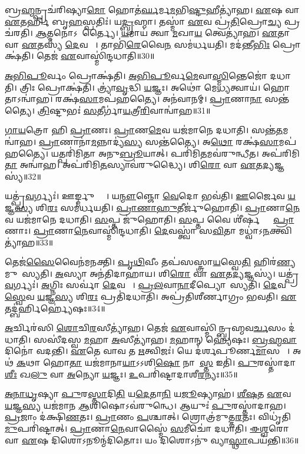 𑌬𑍍𑌰\ul{𑌹𑍍𑌮}𑌨𑍍𑌪𑍍𑌰𑌚॑𑌰𑌿𑌷𑍍𑌯𑌾\ul{𑌮𑍋} 𑌹𑍋𑌤॑\ul{𑌰𑍍𑌘}𑌰𑍍𑌮\ul{𑌮}𑌭𑌿\ul{𑌷𑍍𑌟𑍁}𑌹𑍀𑌤𑍍𑌯𑌾॑𑌹। 
\ul{𑌏}𑌷 𑌵𑌾 \ul{𑌏}𑌤𑌰𑍍\mbox{}\ul{𑌹𑌿} 𑌬𑍃\ul{𑌹}𑌸𑍍𑌪𑌤𑌿𑌃॑। 
𑌯\ul{𑌦𑍍𑌬𑍍𑌰}𑌹𑍍𑌮𑌾। 
𑌤𑌸𑍍𑌮𑌾॑ \ul{𑌏}𑌵 𑌪𑍍𑌰॑\ul{𑌤𑌿}𑌪𑍍𑌰𑍋\ul{𑌚𑍍𑌯} 𑌪𑍍𑌰𑌚॑𑌰𑌤𑌿। 
\ul{𑌆}𑌤𑍍𑌮𑌨𑍋𑌽𑌨𑌾᳚𑌰𑍍𑌤𑍍𑌯𑍈। 
\ul{𑌯}𑌮𑌾𑌯॑ 𑌤𑍍𑌵𑌾 \ul{𑌮}𑌖𑌾\ul{𑌯} 𑌤𑍍𑌵𑍇𑌤𑍍𑌯𑌾॑𑌹। 
\ul{𑌏}𑌤𑌾 𑌵𑌾 \ul{𑌏}𑌤𑌸𑍍𑌯॑ \ul{𑌦𑍇}𑌵𑌤𑌾𑌃᳚। 
𑌤𑌾𑌭𑌿॑\ul{𑌰𑍇}𑌵𑍈\ul{𑌨}\ul{} 𑌸𑌮॑𑌰𑍍𑌧𑌯𑌤𑌿। 
𑌮𑌦॑𑌨𑍍𑌤𑍀\ul{𑌭𑌿𑌃} 𑌪𑍍𑌰𑍋𑌕𑍍𑌷॑𑌤𑌿। 
𑌤𑍇𑌜॑ \ul{𑌏}𑌵𑌾𑌸𑍍𑌮𑌿॑𑌨𑍍𑌦𑌧𑌾𑌤𑌿॥30॥

\ul{𑌅}\ul{𑌭𑌿}\ul{𑌪𑍂}𑌰𑍍𑌵𑌂 𑌪𑍍𑌰𑍋𑌕𑍍𑌷॑𑌤𑌿। 
\ul{𑌅}\ul{𑌭𑌿}\ul{𑌪𑍂}𑌰𑍍𑌵\ul{𑌮𑍇}𑌵𑌾\ul{𑌸𑍍𑌮𑌿}𑌨𑍍𑌤𑍇𑌜𑍋॑ 𑌦𑌧𑌾𑌤𑌿। 
𑌤𑍍𑌰𑌿𑌃 𑌪𑍍𑌰𑍋𑌕𑍍𑌷॑𑌤𑌿। 
𑌤𑍍𑌰𑍍𑌯𑌾॑\ul{𑌵𑍃}𑌦𑍍𑌧𑌿 \ul{𑌯}𑌜𑍍𑌞𑌃। 
𑌅𑌥𑍋॑ 𑌮𑍇\ul{𑌧𑍍𑌯}𑌤𑍍𑌵𑌾𑌯॑। 
𑌹𑍋𑌤𑌾𑌽𑌨𑍍𑌵𑌾॑𑌹। 
𑌰𑌕𑍍𑌷॑\ul{𑌸𑌾}𑌮𑌪॑𑌹𑌤𑍍𑌯𑍈। 
𑌅𑌨॑𑌵𑌾𑌨𑌮𑍍। 
\ul{𑌪𑍍𑌰𑌾}𑌣𑌾\ul{𑌨𑌾}\ul{} 𑌸𑌨𑍍𑌤॑𑌤𑍍𑌯𑍈। 
\ul{𑌤𑍍𑌰𑌿}𑌷𑍍𑌟𑍁𑌭𑌃॑ \ul{𑌸}𑌤𑍀𑌰𑍍𑌗𑌾॑\ul{𑌯}𑌤𑍍𑌰𑍀\ul{𑌰𑌿}𑌵𑌾𑌨𑍍𑌵𑌾॑𑌹॥31॥

\ul{𑌗𑌾}\ul{𑌯}𑌤𑍍𑌰𑍋 𑌹𑌿 \ul{𑌪𑍍𑌰𑌾}𑌣𑌃। 
\ul{𑌪𑍍𑌰𑌾}𑌣\ul{𑌮𑍇}𑌵 𑌯𑌜॑𑌮𑌾𑌨𑍇 𑌦𑌧𑌾𑌤𑌿। 
𑌸𑌨𑍍𑌤॑\ul{𑌤}𑌮𑌨𑍍𑌵𑌾॑𑌹। 
\ul{𑌪𑍍𑌰𑌾}𑌣𑌾𑌨𑌾॑\ul{𑌮}𑌨𑍍𑌨𑌾𑌦𑍍𑌯॑\ul{𑌸𑍍𑌯} 𑌸𑌨𑍍𑌤॑𑌤𑍍𑌯𑍈। 
𑌅\ul{𑌥𑍋} 𑌰𑌕𑍍𑌷॑\ul{𑌸𑌾}𑌮𑌪॑𑌹𑌤𑍍𑌯𑍈। 
𑌯𑌤𑍍𑌪𑌰𑌿॑𑌮𑌿𑌤𑌾 𑌅𑌨𑍁\ul{𑌬𑍍𑌰𑍂}𑌯𑌾𑌤𑍍। 
𑌪𑌰𑌿॑𑌮𑌿\ul{𑌤}𑌮𑌵॑𑌰𑍁𑌨𑍍𑌧𑍀𑌤। 
𑌅𑌪॑𑌰𑌿𑌮𑌿\ul{𑌤𑌾} 𑌅𑌨𑍍𑌵𑌾॑𑌹। 
𑌅𑌪॑𑌰𑌿𑌮𑌿\ul{𑌤}𑌸𑍍𑌯𑌾𑌵॑𑌰𑍁𑌦𑍍𑌧𑍍𑌯𑍈। 
𑌶𑌿\ul{𑌰𑍋} 𑌵𑌾 \ul{𑌏}𑌤\ul{𑌦𑍍𑌯}𑌜𑍍𑌞𑌸𑍍𑌯॑॥32॥

𑌯𑌤𑍍𑌪𑍍𑌰॑\ul{𑌵}𑌰𑍍𑌗𑍍𑌯𑌃॑। 
𑌊𑌰𑍍𑌙𑍍𑌮𑍁𑌞𑍍𑌜𑌾𑌃᳚। 
𑌯\ul{𑌨𑍍𑌮𑍗}𑌞𑍍𑌜𑍋 \ul{𑌵𑍇}𑌦𑍋 𑌭𑌵॑𑌤𑌿। 
\ul{𑌊}𑌰𑍍𑌜𑍈𑌵 \ul{𑌯}𑌜𑍍𑌞\ul{𑌸𑍍𑌯} 𑌶𑌿\ul{𑌰𑌃} 𑌸𑌮॑𑌰𑍍𑌧𑌯𑌤𑌿। 
\ul{𑌪𑍍𑌰𑌾}\ul{𑌣𑌾}\ul{𑌹𑍁}𑌤𑍀𑌰𑍍𑌜𑍁॑𑌹𑍋𑌤𑌿। 
\ul{𑌪𑍍𑌰𑌾}𑌣𑌾\ul{𑌨𑍇}𑌵 𑌯𑌜॑𑌮𑌾𑌨𑍇 𑌦𑌧𑌾𑌤𑌿। 
\ul{𑌸}𑌪𑍍𑌤 𑌜𑍁॑𑌹𑍋𑌤𑌿। 
\ul{𑌸}𑌪𑍍𑌤 𑌵𑍈 𑌶𑍀॑𑌰𑍍\mbox{}\ul{𑌷}𑌣𑍍𑌯𑌾𑌃᳚ \ul{𑌪𑍍𑌰𑌾}𑌣𑌾𑌃। 
\ul{𑌪𑍍𑌰𑌾}𑌣𑌾\ul{𑌨𑍇}𑌵𑌾𑌸𑍍𑌮𑌿॑𑌨𑍍𑌦𑌧𑌾𑌤𑌿। 
\ul{𑌦𑍇}𑌵𑌸𑍍𑌤𑍍𑌵𑌾॑ 𑌸\ul{𑌵𑌿}𑌤𑌾 𑌮𑌧𑍍𑌵𑌾॑𑌽\ul{𑌨}𑌕𑍍𑌤𑍍𑌵𑌿𑌤𑍍𑌯𑌾॑𑌹॥33॥

𑌤𑍇𑌜॑\ul{𑌸𑍈}𑌵𑍈𑌨॑𑌮𑌨𑌕𑍍𑌤𑌿। 
\ul{𑌪𑍃}\ul{𑌥𑌿}𑌵𑍀𑌂 𑌤𑌪॑𑌸𑌸𑍍𑌤𑍍𑌰𑌾\ul{𑌯}𑌸𑍍𑌵𑍇\ul{𑌤𑌿} 𑌹𑌿𑌰॑\ul{𑌣𑍍𑌯}𑌮𑍁𑌪𑌾᳚𑌸𑍍𑌯𑌤𑌿। 
\ul{𑌅}𑌸𑍍𑌯𑌾 𑌅𑌨॑𑌤𑌿𑌦𑌾𑌹𑌾𑌯। 
𑌶𑌿\ul{𑌰𑍋} 𑌵𑌾 \ul{𑌏}𑌤\ul{𑌦𑍍𑌯}𑌜𑍍𑌞𑌸𑍍𑌯॑। 
𑌯𑌤𑍍𑌪𑍍𑌰॑\ul{𑌵}𑌰𑍍𑌗𑍍𑌯𑌃॑। 
\ul{𑌅}𑌗𑍍𑌨𑌿𑌃 𑌸𑌰𑍍𑌵𑌾॑ \ul{𑌦𑍇}𑌵𑌤𑌾𑌃᳚। 
\ul{𑌪𑍍𑌰}\ul{𑌲}𑌵𑌾\ul{𑌨𑌾}𑌦𑍀𑌪𑍍𑌯𑍋𑌪𑌾᳚𑌸𑍍𑌯𑌤𑌿। 
\ul{𑌦𑍇}𑌵𑌤𑌾᳚\ul{𑌸𑍍𑌵𑍇}𑌵 \ul{𑌯}𑌜𑍍𑌞\ul{𑌸𑍍𑌯} 𑌶𑌿\ul{𑌰𑌃} 𑌪𑍍𑌰𑌤𑌿॑𑌦𑌧𑌾𑌤𑌿। 
𑌅𑌪𑍍𑌰॑𑌤𑌿𑌶𑍀𑌰𑍍𑌣𑌾𑌗𑍍𑌰𑌂 𑌭𑌵𑌤𑌿। 
\ul{𑌏}𑌤𑌦𑍍𑌬॑𑌰𑍍\mbox{}\ul{𑌹𑌿}𑌰𑍍\mbox{}𑌹𑍍𑌯𑍇॑𑌷𑌃॥34॥

\ul{𑌅}𑌰𑍍𑌚𑌿𑌰॑𑌸𑌿 \ul{𑌶𑍋}𑌚𑌿\ul{𑌰}𑌸𑍀𑌤𑍍𑌯𑌾॑𑌹। 
𑌤𑍇𑌜॑ \ul{𑌏}𑌵𑌾𑌸𑍍𑌮𑌿॑𑌨𑍍𑌬𑍍𑌰𑌹𑍍𑌮𑌵\ul{𑌰𑍍𑌚}𑌸𑌂 𑌦॑𑌧𑌾𑌤𑌿। 
𑌸𑌸𑍀॑𑌦𑌸𑍍𑌵 \ul{𑌮}𑌹𑌾 \ul{𑌅}𑌸𑍀𑌤𑍍𑌯𑌾॑𑌹। 
\ul{𑌮}𑌹𑌾𑌨𑍍 𑌹𑍍𑌯𑍇॑𑌷𑌃। 
\ul{𑌬𑍍𑌰}\ul{𑌹𑍍𑌮}\ul{𑌵𑌾}𑌦𑌿𑌨𑍋॑ 𑌵𑌦𑌨𑍍𑌤𑌿। 
\ul{𑌏}𑌤𑍇 𑌵𑌾𑌵 𑌤 \ul{𑌋}𑌤𑍍𑌵𑌿𑌜𑌃॑। 
𑌯𑍇 𑌦॑𑌰𑍍\mbox{}𑌶𑌪𑍂𑌰𑍍𑌣\ul{𑌮𑌾}𑌸𑌯𑍋𑌃᳚। 
𑌅𑌥॑ \ul{𑌕}𑌥𑌾 𑌹𑍋\ul{𑌤𑌾} 𑌯𑌜॑𑌮𑌾𑌨𑌾\ul{𑌯𑌾}𑌽𑌽𑌶𑌿\ul{𑌷𑍋} 𑌨𑌾𑌶𑌾᳚\ul{𑌸𑍍𑌤} 𑌇𑌤𑌿॑। 
\ul{𑌪𑍁}𑌰𑌸𑍍𑌤𑌾॑𑌦𑌾\ul{𑌶𑍀𑌃} 𑌖\ul{𑌲𑍁} 𑌵𑌾 \ul{𑌅}𑌨𑍍𑌯𑍋 \ul{𑌯}𑌜𑍍𑌞𑌃। 
\ul{𑌉}𑌪𑌰𑌿॑𑌷𑍍𑌟𑌾𑌦𑌾𑌶𑍀\ul{𑌰}𑌨𑍍𑌯𑌃॥35॥

\ul{𑌅}\ul{𑌨𑌾}\ul{𑌧𑍃}𑌷𑍍𑌯𑌾 \ul{𑌪𑍁}𑌰\ul{𑌸𑍍𑌤𑌾}𑌦𑌿\ul{𑌤𑌿} 𑌯\ul{𑌦𑍇}𑌤𑌾\ul{𑌨𑌿} 𑌯\ul{𑌜𑍂}\ul{}𑌷𑍍𑌯𑌾𑌹॑। 
\ul{𑌶𑍀}\ar{}\mbox{}\ul{𑌷}𑌤 \ul{𑌏}𑌵 \ul{𑌯}𑌜𑍍𑌞\ul{𑌸𑍍𑌯} 𑌯𑌜॑𑌮𑌾𑌨 \ul{𑌆}𑌶𑌿𑌷𑍋𑌽𑌵॑𑌰𑍁𑌨𑍍𑌧𑍇। 
𑌆𑌯𑍁𑌃॑ \ul{𑌪𑍁}𑌰𑌸𑍍𑌤𑌾॑𑌦𑌾𑌹। 
\ul{𑌪𑍍𑌰}𑌜𑌾𑌂 𑌦॑𑌕𑍍𑌷𑌿\ul{𑌣}𑌤𑌃। 
\ul{𑌪𑍍𑌰𑌾}𑌣𑌂 \ul{𑌪}𑌶𑍍𑌚𑌾𑌤𑍍। 
𑌶𑍍𑌰𑍋𑌤𑍍𑌰॑𑌮𑍁𑌤𑍍𑌤\ul{𑌰}𑌤𑌃। 
𑌵𑌿𑌧𑍃॑𑌤𑌿\ul{𑌮𑍁}𑌪𑌰𑌿॑𑌷𑍍𑌟𑌾𑌤𑍍। 
\ul{𑌪𑍍𑌰𑌾}𑌣𑌾\ul{𑌨𑍇}𑌵𑌾𑌸𑍍𑌮𑍈॑ \ul{𑌸}𑌮𑍀𑌚𑍋॑ 𑌦𑌧𑌾𑌤𑌿। 
\ul{𑌈}\ul{𑌶𑍍𑌵}𑌰𑍋 𑌵𑌾 \ul{𑌏}𑌷 𑌦𑌿𑌶𑍋𑌽𑌨𑍂𑌨𑍍𑌮॑𑌦𑌿𑌤𑍋𑌃। 
𑌯𑌂 𑌦𑌿𑌶𑍋𑌽𑌨𑍁॑ 𑌵𑍍𑌯𑌾\ul{𑌸𑍍𑌥𑌾}𑌪𑌯॑𑌨𑍍𑌤𑌿॥36॥

